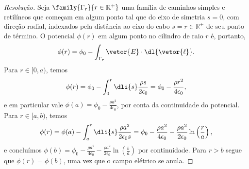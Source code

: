 \begin{proof}[Resolução]
    Seja \(\family{\Gamma_r}{r \in \mathbb{R}^+}\) uma família de caminhos simples e retilíneos que começam em algum ponto tal que do eixo de simetria \(s = 0\), com direção radial, indexados pela distância ao eixo do cabo \(s = r \in \mathbb{R}^+\) de seu ponto de término. O potencial \(\phi(r)\) em algum ponto no cilindro de raio \(r\) é, portanto,
    \begin{equation*}
        \phi(r)  = \phi_0 -\int_{\Gamma_r} \vetor{E}\cdot \dl{\vetor{\ell}}.
    \end{equation*}
    Para \(r \in [0, a)\), temos
    \begin{equation*}
        \phi(r) = \phi_0 -\int_{0}^{r} \dli{s} \frac{\rho s}{2 \epsilon_0}= \phi_0 - \frac{\rho r^2}{4 \epsilon_0},
    \end{equation*}
    e em particular vale \(\phi(a) = \phi_0 - \frac{\rho a^2}{4 \epsilon_0}\), por conta da continuidade do potencial. Para \(r \in [a, b)\), temos
    \begin{equation*}
        \phi(r) = \phi(a) - \int_a^r \dli{s}\frac{\rho a^2}{2 \epsilon_0 s} = \phi_0 - \frac{\rho a^2}{4 \epsilon_0} - \frac{\rho a^2}{2 \epsilon_0} \ln\left(\frac{r}{a}\right),
    \end{equation*}
    e concluímos \(\phi(b) = \phi_0 - \frac{\rho a^2}{4 \epsilon_0} - \frac{\rho a^2}{2 \epsilon_0}\ln\left(\frac{b}{a}\right)\) por continuidade. Para \(r > b\) segue que \(\phi(r) = \phi(b)\), uma vez que o campo elétrico se anula.
\end{proof}
